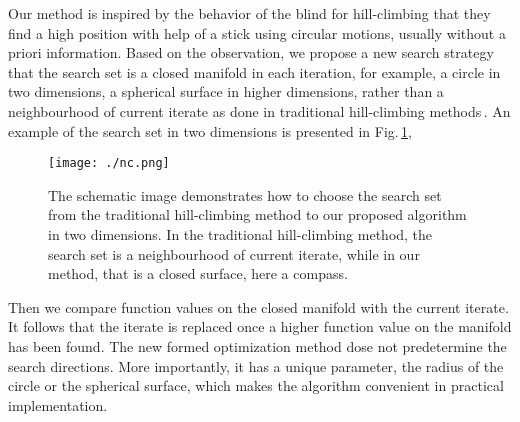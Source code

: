 \documentclass[mathpazo]{aamm}
\begin{document}
Our method is inspired by the behavior of the blind for
hill-climbing that they find a high position with help of a stick using
circular motions, usually without a priori information. 
Based on the observation, we propose a new search strategy
that the search set is a closed manifold in each iteration, for
example, a circle in two dimensions, a spherical surface in
higher dimensions, rather than a neighbourhood of current iterate as done in
traditional hill-climbing methods\,\cite{russell2010artificial}.
An example of the search set in two dimensions is presented in Fig.\,\ref{fig:idea},
\begin{figure}[!htbp]
	\centering
	  \texttt{[image: ./nc.png]}
	\caption{The schematic image demonstrates how to choose the search set
	from the traditional hill-climbing method to our proposed
	algorithm in two dimensions. In the traditional hill-climbing
	method, the search set is a neighbourhood of current iterate,
	while in our method, that is a closed surface, here a compass.}
\label{fig:idea}
\end{figure}
Then we compare function values on the closed
manifold with the current iterate. 
It follows that the iterate is replaced once a higher function
value on the manifold has been found.
The new formed optimization method dose not predetermine the search
directions. More importantly, it has a unique parameter, the 
radius of the circle or the spherical surface, which makes the
algorithm convenient in practical implementation.

\end{document}
